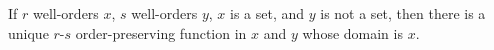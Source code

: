 If $r$ well-orders $x$, $s$ well-orders $y$, $x$ is a set, and $y$ is not a set, then there is a unique $r$-$s$ order-preserving function in $x$ and $y$ whose domain is $x$.
